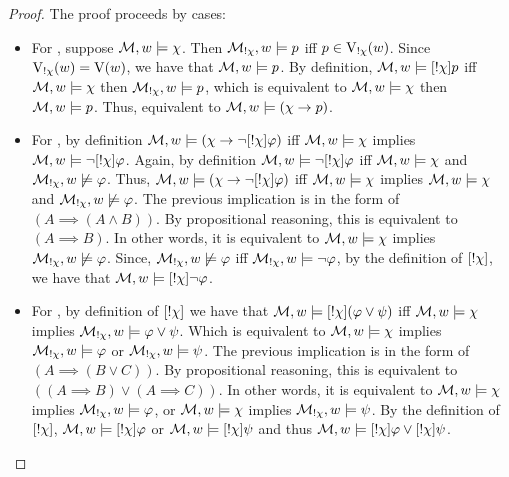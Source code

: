 \begin{proof} The proof proceeds by cases:
\begin{itemize}
\item For , suppose $\mathcal{M},w \models \chi$. Then $\mathcal{M}_{!\chi},w \models p$ iff $p \in \operatorname{V}_{!\chi}(w)$. Since $\operatorname{V}_{!\chi}(w) = \operatorname{V}(w)$, we have that $\mathcal{M},w \models p$.
By definition, $\mathcal{M},w \models [!\chi]p$ iff $\mathcal{M},w \models \chi$ then $\mathcal{M}_{!\chi},w \models p$, which is equivalent to $\mathcal{M},w \models \chi$ then $\mathcal{M},w \models p$.
Thus, equivalent to $\mathcal{M},w \models (\chi \rightarrow p)$.

\item For , by definition $\mathcal{M},w \models (\chi \rightarrow \neg[!\chi]\varphi)$ iff $\mathcal{M},w \models \chi$ implies $\mathcal{M},w \models \neg[!\chi]\varphi$.
Again, by definition $\mathcal{M},w \models \neg[!\chi]\varphi$ iff $\mathcal{M},w \models \chi$ and $\mathcal{M}_{!\chi},w \not\models \varphi$.
Thus, $\mathcal{M},w \models (\chi \rightarrow \neg[!\chi]\varphi)$ iff $\mathcal{M},w \models \chi$ implies $\mathcal{M},w \models \chi$ and $\mathcal{M}_{!\chi},w \not\models \varphi$.
The previous implication is in the form of $(A \implies (A \wedge B))$.
By propositional reasoning, this is equivalent to $(A \implies B)$.
In other words, it is equivalent to $\mathcal{M},w \models \chi$ implies $\mathcal{M}_{!\chi},w \not\models \varphi$.
Since, $\mathcal{M}_{!\chi},w \not\models \varphi$ iff $\mathcal{M}_{!\chi},w \models \neg\varphi$, by the definition of $[!\chi]$, we have that $\mathcal{M},w \models [!\chi]\neg\varphi$.

\item For , by definition of $[!\chi]$ we have that $\mathcal{M},w \models [!\chi](\varphi \vee \psi)$ iff $\mathcal{M},w \models \chi$ implies $\mathcal{M}_{!\chi},w \models \varphi \vee \psi$. Which is equivalent to $\mathcal{M},w \models \chi$ implies $\mathcal{M}_{!\chi},w \models \varphi$ or $\mathcal{M}_{!\chi},w \models \psi$.
The previous implication is in the form of $(A \implies (B \vee C))$. By propositional reasoning, this is equivalent to $((A \implies B) \vee (A \implies C))$.
In other words, it is equivalent to $\mathcal{M},w \models \chi$ implies $\mathcal{M}_{!\chi},w \models \varphi$, or $\mathcal{M},w \models \chi$ implies $\mathcal{M}_{!\chi},w \models \psi$.
By the definition of $[!\chi]$, $\mathcal{M},w \models [!\chi]\varphi$ or $\mathcal{M},w \models [!\chi]\psi$ and thus $\mathcal{M},w \models [!\chi]\varphi \vee [!\chi]\psi$.


\end{itemize}
\end{proof}
